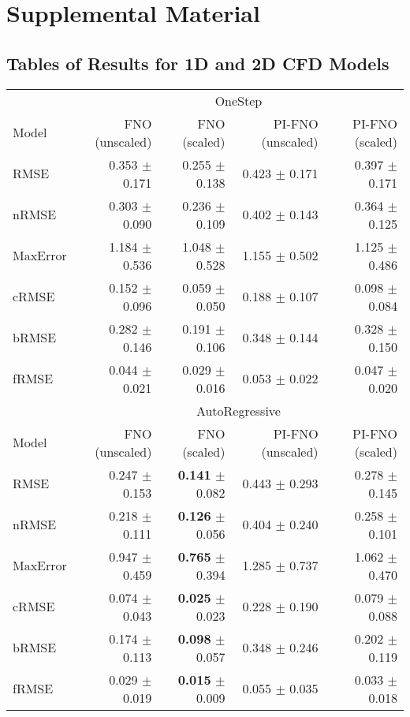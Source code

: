 \setcounter{section}{5}


\section{Supplemental Material}

\subsection{Tables of Results for 1D and 2D CFD Models}

\begin{table}[h]
    \centering
    \begin{tabular}{lrrrr}
        \toprule
              &  \multicolumn{4}{c}{OneStep} \\
        \cmidrule(lr){2-5}
        Model &  FNO (unscaled) &  FNO (scaled) &  PI-FNO (unscaled) &  PI-FNO (scaled) \\
        \midrule
        RMSE     &  0.353 $\pm$ 0.171 &  0.255 $\pm$ 0.138 &  0.423 $\pm$ 0.171 &  0.397 $\pm$ 0.171 \\
        nRMSE    &  0.303 $\pm$ 0.090 &  0.236 $\pm$ 0.109 &  0.402 $\pm$ 0.143 &  0.364 $\pm$ 0.125 \\
        MaxError &  1.184 $\pm$ 0.536 &  1.048 $\pm$ 0.528 &  1.155 $\pm$ 0.502 &  1.125 $\pm$ 0.486 \\
        cRMSE    &  0.152 $\pm$ 0.096 &  0.059 $\pm$ 0.050 &  0.188 $\pm$ 0.107 &  0.098 $\pm$ 0.084 \\
        bRMSE    &  0.282 $\pm$ 0.146 &  0.191 $\pm$ 0.106 &  0.348 $\pm$ 0.144 &  0.328 $\pm$ 0.150 \\
        fRMSE    &  0.044 $\pm$ 0.021 &  0.029 $\pm$ 0.016 &  0.053 $\pm$ 0.022 &  0.047 $\pm$ 0.020 \\
        \midrule
              &  \multicolumn{4}{c}{AutoRegressive} \\
        \cmidrule(lr){2-5}
        Model &  FNO (unscaled) &  FNO (scaled) &  PI-FNO (unscaled) &  PI-FNO (scaled) \\
        \midrule
        RMSE     &  0.247 $\pm$ 0.153 &  \textbf{0.141} $\pm$ 0.082 &  0.443 $\pm$ 0.293 &  0.278 $\pm$ 0.145 \\
        nRMSE    &  0.218 $\pm$ 0.111 &  \textbf{0.126} $\pm$ 0.056 &  0.404 $\pm$ 0.240 &  0.258 $\pm$ 0.101 \\
        MaxError &  0.947 $\pm$ 0.459 &  \textbf{0.765} $\pm$ 0.394 &  1.285 $\pm$ 0.737 &  1.062 $\pm$ 0.470 \\
        cRMSE    &  0.074 $\pm$ 0.043 &  \textbf{0.025} $\pm$ 0.023 &  0.228 $\pm$ 0.190 &  0.079 $\pm$ 0.088 \\
        bRMSE    &  0.174 $\pm$ 0.113 &  \textbf{0.098} $\pm$ 0.057 &  0.348 $\pm$ 0.246 &  0.202 $\pm$ 0.119 \\
        fRMSE    &  0.029 $\pm$ 0.019 &  \textbf{0.015} $\pm$ 0.009 &  0.055 $\pm$ 0.035 &  0.033 $\pm$ 0.018 \\
        \midrule
    \end{tabular}
    

\end{table}
